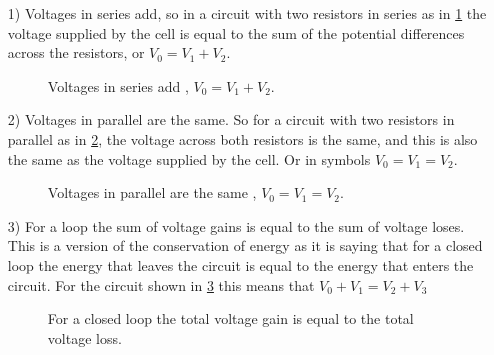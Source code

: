 \documentclass[a4paper,12pt]{book}
\begin{document}
\begin{itemize}
\setlength{\itemsep}{-5pt}
    \item[1)] Voltages in series add, so in a circuit with two resistors in series as in \cref{fig: voltage rule 1} the voltage supplied by the cell is equal to the sum of the potential differences across the resistors, or $V_{0}=V_{1}+V_{2}$.
     \begin{figure}[ht]
    \centering
    \caption{Voltages in series add , $V_{0}=V_{1}+V_{2}$.}
    \label{fig: voltage rule 1}
\end{figure}
    \item[2)] Voltages in parallel are the same. So for a circuit with two resistors in parallel as in \cref{fig: voltage rule 2}, the voltage across both resistors is the same, and this is also the same as the voltage supplied by the cell. Or in symbols $V_{0}=V_{1}=V_{2}$.
    \begin{figure}[ht]
    \centering
    \caption{Voltages in parallel are the same , $V_{0}=V_{1}=V_{2}$.}
    \label{fig: voltage rule 2}
\end{figure}
    \item[3)] For a loop the sum of voltage gains is equal to the sum of voltage loses. This is a version of the conservation of energy as it is saying that for a closed loop the energy that leaves the circuit is equal to the energy that enters the circuit. For the circuit shown in \cref{fig: voltage rule 3} this means that $V_{0}+V_{1}=V_{2}+V_{3}$
       \begin{figure}[ht]
    \centering
    \caption{For a closed loop the total voltage gain is equal to the total voltage loss.}
    \label{fig: voltage rule 3}
\end{figure}
\end{itemize}
\end{document}
